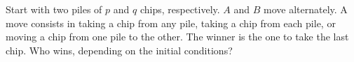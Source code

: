 Start with two piles of $p$ and $q$ chips, respectively. $A$ and $B$ move alternately. A move consists in taking a chip from any pile, taking a chip from each pile, or moving a chip from one pile to the other. The winner is the one to take the last chip. Who wins, depending on the initial conditions?
